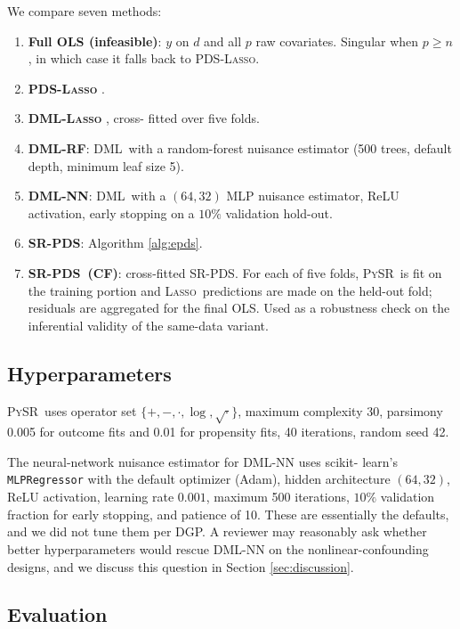 \documentclass[11pt, a4paper]{article}
\theoremstyle{plain}
\theoremstyle{definition}
\theoremstyle{remark}
\newcommand{\lasso}{\textsc{Lasso}}
\newcommand{\pds}{\textsc{PDS}}
\newcommand{\dml}{\textsc{DML}}
\newcommand{\pysr}{\textsc{PySR}}
\newcommand{\epds}{\textsc{SR-PDS}}
\begin{document}
We compare seven methods:
\begin{enumerate}
    \item \textbf{Full OLS (infeasible)}: $y$ on $d$ and all $p$
          raw covariates. Singular when $p \geq n$, in which case
          it falls back to \pds-\lasso.
    \item \textbf{\pds-\lasso} \citep{bch2014}.
    \item \textbf{\dml-\lasso} \citep{chernozhukov2018}, cross-%
          fitted over five folds.
    \item \textbf{\dml-RF}: \dml\ with a random-forest nuisance
          estimator (500 trees, default depth, minimum leaf
          size 5).
    \item \textbf{\dml-NN}: \dml\ with a $(64, 32)$ MLP nuisance
          estimator, ReLU activation, early stopping on a $10\%$
          validation hold-out.
    \item \textbf{\epds}: Algorithm \ref{alg:epds}.
    \item \textbf{\epds\ (CF)}: cross-fitted \epds. For each of
          five folds, \pysr\ is fit on the training portion and
          \lasso\ predictions are made on the held-out fold;
          residuals are aggregated for the final OLS. Used as a
          robustness check on the inferential validity of the
          same-data variant.
\end{enumerate}

\subsection{Hyperparameters}

\pysr\ uses operator set $\{+, -, \cdot, \log, \sqrt{\cdot}\}$,
maximum complexity 30, parsimony 0.005 for outcome fits and 0.01
for propensity fits, 40 iterations, random seed 42.

The neural-network nuisance estimator for \dml-NN uses scikit-%
learn's \texttt{MLPRegressor} with the default optimizer (Adam),
hidden architecture $(64, 32)$, ReLU activation, learning rate
$0.001$, maximum 500 iterations, $10\%$ validation fraction for
early stopping, and patience of 10. These are essentially the
defaults, and we did not tune them per DGP. A reviewer may
reasonably ask whether better hyperparameters would rescue
\dml-NN on the nonlinear-confounding designs, and we discuss
this question in Section \ref{sec:discussion}.

\subsection{Evaluation}
\end{document}
